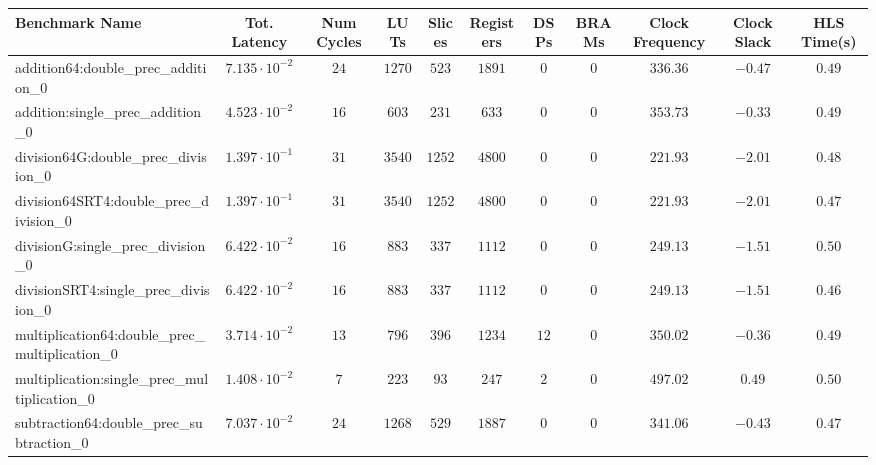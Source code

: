 \begin{tabular}{|l|c|c|c|c|c|c|c|c|c|c|}
\hline
Benchmark Name                                   & Tot. Latency            & Num Cycles & LUTs      & Slices   & Registers & DSPs   & BRAMs & Clock Frequency & Clock Slack & HLS Time(s) \\
\hline
addition64:double\_prec\_addition\_0             & $ 7.135 \cdot 10^{-2} $ & $ 24     $ & $ 1270  $ & $ 523  $ & $ 1891  $ & $ 0  $ & $ 0 $ & $ 336.36      $ & $ -0.47   $ & $ 0.49    $ \\
addition:single\_prec\_addition\_0               & $ 4.523 \cdot 10^{-2} $ & $ 16     $ & $ 603   $ & $ 231  $ & $ 633   $ & $ 0  $ & $ 0 $ & $ 353.73      $ & $ -0.33   $ & $ 0.49    $ \\
division64G:double\_prec\_division\_0            & $ 1.397 \cdot 10^{-1} $ & $ 31     $ & $ 3540  $ & $ 1252 $ & $ 4800  $ & $ 0  $ & $ 0 $ & $ 221.93      $ & $ -2.01   $ & $ 0.48    $ \\
division64SRT4:double\_prec\_division\_0         & $ 1.397 \cdot 10^{-1} $ & $ 31     $ & $ 3540  $ & $ 1252 $ & $ 4800  $ & $ 0  $ & $ 0 $ & $ 221.93      $ & $ -2.01   $ & $ 0.47    $ \\
divisionG:single\_prec\_division\_0              & $ 6.422 \cdot 10^{-2} $ & $ 16     $ & $ 883   $ & $ 337  $ & $ 1112  $ & $ 0  $ & $ 0 $ & $ 249.13      $ & $ -1.51   $ & $ 0.50    $ \\
divisionSRT4:single\_prec\_division\_0           & $ 6.422 \cdot 10^{-2} $ & $ 16     $ & $ 883   $ & $ 337  $ & $ 1112  $ & $ 0  $ & $ 0 $ & $ 249.13      $ & $ -1.51   $ & $ 0.46    $ \\
multiplication64:double\_prec\_multiplication\_0 & $ 3.714 \cdot 10^{-2} $ & $ 13     $ & $ 796   $ & $ 396  $ & $ 1234  $ & $ 12 $ & $ 0 $ & $ 350.02      $ & $ -0.36   $ & $ 0.49    $ \\
multiplication:single\_prec\_multiplication\_0   & $ 1.408 \cdot 10^{-2} $ & $ 7      $ & $ 223   $ & $ 93   $ & $ 247   $ & $ 2  $ & $ 0 $ & $ 497.02      $ & $ 0.49    $ & $ 0.50    $ \\
subtraction64:double\_prec\_subtraction\_0       & $ 7.037 \cdot 10^{-2} $ & $ 24     $ & $ 1268  $ & $ 529  $ & $ 1887  $ & $ 0  $ & $ 0 $ & $ 341.06      $ & $ -0.43   $ & $ 0.47    $ \\

\end{tabular}
